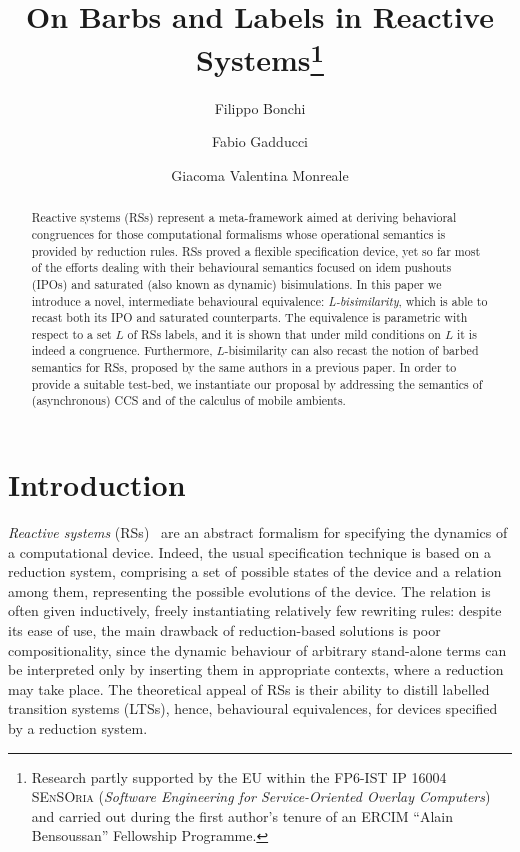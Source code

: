 \documentclass[copyright,creativecommons]{eptcs}
\title{On Barbs and Labels in Reactive Systems\thanks{Research
    partly supported by the EU within the FP6-IST IP 16004 \textsc{SEnSOria} (\emph{Software Engineering for
 Service-Oriented Overlay Computers}) and carried out during the first author's tenure of
an ERCIM ``Alain Bensoussan'' Fellowship Programme.}}
\author{Filippo Bonchi
\institute{Centrum voor Wiskunde en
Informatica, Amsterdam, The Netherlands}
\email{Filippo.Bonchi@cwi.nl}
\and
Fabio Gadducci
\institute{Dipartimento di Informatica,
Universit\`a di Pisa, Italy}
\email{fabio@di.unipi.it}
\and
Giacoma Valentina Monreale
\institute{Dipartimento di Informatica,
Universit\`a di Pisa, Italy}
\email{vale@di.unipi.it}
}
\newcommand{\<}{\langle}
\renewcommand{\>}{\rangle}
\begin{document}
\maketitle

\begin{abstract}
  Reactive systems (RSs) represent a meta-framework aimed at deriving
  behavioral congruences for those computational formalisms whose
  operational semantics is provided by reduction rules. RSs proved a
  flexible specification device, yet so far most of the efforts
  dealing with their behavioural semantics focused on idem pushouts
  (IPOs) and saturated (also known as dynamic) bisimulations. In this
  paper we introduce a novel, intermediate behavioural equivalence:
  \emph{L-bisimilarity}, which is able to recast both its IPO and
  saturated counterparts. The equivalence is parametric with respect
  to a set $L$ of RSs labels, and it is shown that under mild
  conditions on $L$ it is indeed a congruence. Furthermore,
  $L$-bisimilarity can also recast the notion of barbed semantics for
  RSs, proposed by the same authors in a previous paper. In order to
  provide a suitable test-bed, we instantiate our proposal by
  addressing the semantics of (asynchronous) CCS and of the calculus
  of mobile ambients.
\end{abstract}



\section{Introduction}
\label{sec:Intro}

\emph{Reactive systems} (RSs)~\cite{DBLP:conf/concur/LeiferM00} are an
abstract formalism for specifying the dynamics of a computational
device. Indeed, the usual specification technique is based on a
reduction system, comprising a set of possible states of the device
and a relation among them, representing the possible evolutions of the
device.
The relation is often given inductively, freely instantiating
relatively few rewriting rules: despite its ease of use, the main
drawback of reduction-based solutions is poor compositionality, since
the dynamic behaviour of arbitrary stand-alone terms can be
interpreted only by inserting them in appropriate contexts, where a
reduction may take place. The theoretical appeal of RSs is their
ability to distill labelled transition systems (LTSs), hence,
behavioural equivalences, for devices specified by a reduction system.
\end{document}
